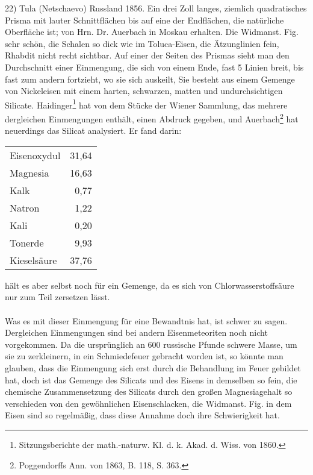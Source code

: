 \documentclass[a4paper, 11pt, oneside]{article}
\begin{document}
22) Tula (Netschaevo) Russland 1856. Ein drei Zoll langes, ziemlich quadratisches Prisma mit lauter Schnittflächen bis auf eine der Endflächen, die natürliche Oberfläche ist; von Hrn. Dr. Auerbach in Moskau erhalten. Die Widmanst. Fig. sehr schön, die Schalen so dick wie im Toluca-Eisen, die Ätzunglinien fein, Rhabdit nicht recht sichtbar. Auf einer der Seiten des Prismas sieht man den Durchschnitt einer Einmengung, die sich von einem Ende, fast 5 Linien breit, bis fast zum andern fortzieht, wo sie sich auskeilt, Sie besteht aus einem Gemenge von Nickeleisen mit einem harten, schwarzen, matten und undurchsichtigen Silicate. Haidinger\footnote{Sitzungsberichte der math.-naturw. Kl. d. k. Akad. d. Wiss. von 1860.} hat von dem Stücke der Wiener Sammlung, das mehrere dergleichen Einmengungen enthält, einen Abdruck gegeben, und Auerbach\footnote{Poggendorffs Ann. von 1863, B. 118, S. 363.} hat neuerdings das Silicat analysiert. Er fand darin:
\begin{center}
\begin{tabular}{ l r }
    Eisenoxydul & 31,64\\
    Magnesia & 16,63\\
    Kalk & 0,77\\
    Natron & 1,22\\
    Kali & 0,20\\
    Tonerde & 9,93\\
    Kieselsäure & 37,76\\
\end{tabular}
\end{center}
hält es aber selbst noch für ein Gemenge, da es sich von Chlorwasserstoffsäure nur zum Teil zersetzen lässt.
\paragraph{}
Was es mit dieser Einmengung für eine Bewandtnis hat, ist schwer zu sagen. Dergleichen Einmengungen sind bei andern Eisenmeteoriten noch nicht vorgekommen. Da die ursprünglich an 600 russische Pfunde schwere Masse, um sie zu zerkleinern, in ein Schmiedefeuer gebracht worden ist, so könnte man glauben, dass die Einmengung sich erst durch die Behandlung im Feuer gebildet hat, doch ist das Gemenge des Silicats und des Eisens in demselben so fein, die chemische Zusammensetzung des Silicats durch den großen Magnesiagehalt so verschieden von den gewöhnlichen Eisenschlacken, die Widmanst. Fig. in dem Eisen sind so regelmäßig, dass diese Annahme doch ihre Schwierigkeit hat.
\end{document}
